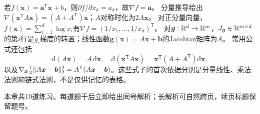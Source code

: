 若$f(\boldsymbol{x})=\boldsymbol a^{\mathsf T}\boldsymbol x+b$，则$\partial f/\partial x_k=a_k$，故$\nabla f=\boldsymbol a$。
分量推导给出$\nabla(\boldsymbol{x}^{\mathsf T}A\boldsymbol{x})=(A+A^{\mathsf T})\boldsymbol{x}$；$A$对称时化为$2A\boldsymbol{x}$。
对正分量向量，$f(\boldsymbol x)=\sum_{i=1}^{d}\log x_i$有$\nabla f=(1/x_1,\ldots,1/x_d)^{\mathsf T}$。
对$\boldsymbol g:\mathbb{R}^d\to\mathbb{R}^m$，$J_{\boldsymbol g}\in\mathbb{R}^{m\times d}$的第$i$行是$g_i$梯度的转置；线性函数$\boldsymbol g(\boldsymbol x)=A\boldsymbol x+\boldsymbol b$的Jacobian矩阵为$A$。
常用公式还包括
\[
\mathrm d(A\boldsymbol x)=A\,\mathrm d\boldsymbol x,\quad
\mathrm d(\boldsymbol x^{\mathsf T}A\boldsymbol x)
=\boldsymbol x^{\mathsf T}(A+A^{\mathsf T})\mathrm d\boldsymbol x,
\]
以及$\nabla_{\boldsymbol x}\frac12\lVert A\boldsymbol x-\boldsymbol b\rVert_2^2=A^{\mathsf T}(A\boldsymbol x-\boldsymbol b)$。这些式子的首次依据分别是分量线性、乘法法则和链式法则，不是仅供记忆的表格。


\begin{chapterexercisebox}
\label{schema:V1-C03:CH-34}
\label{schema:V1-C03:CH-35}
本章共19道练习。每道题干后立即给出同号解析；长解析可自然跨页，续页标题保留题号。
\end{chapterexercisebox}

